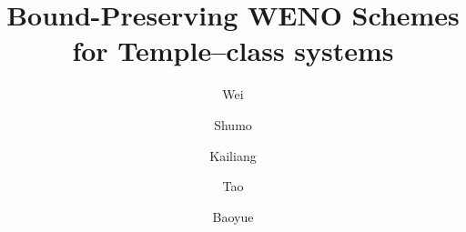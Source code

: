 \documentclass[times,final,11pt]{elsarticle}
\numberwithin{equation}{section}
\theoremstyle{definition}
\theoremstyle{remark}
\begin{document}

\begin{frontmatter}
	
	\title {{\bf Bound-Preserving WENO Schemes for Temple--class systems}
	}
	
	

	\author[XU]{Wei }
	
	\author[ICM,SUSTech]{Shumo }
	
	\author[SUSTech,ICM,NCAMS]{Kailiang }
	
	\author[USTC]{Tao }

	\author[SUSTech]{Baoyue }
	
	\address[XU]{School of Mathematical Sciences, Xiamen University, Xiamen, Fujian 361005, China.}
	\address[SUSTech]{Department of Mathematics, Southern University of Science and Technology, Shenzhen 518055, China.}
	\address[ICM]{Shenzhen International Center for Mathematics, Southern University of Science and Technology, Shenzhen 518055, China.}
	\address[NCAMS]{National Center for Applied Mathematics Shenzhen (NCAMS), Shenzhen 518055, China.}
	\address[USTC]{School of Mathematical Sciences, University of Science and Technology of China, Hefei, Anhui 230026, China.}
	
	

\end{frontmatter}
\end{document}
